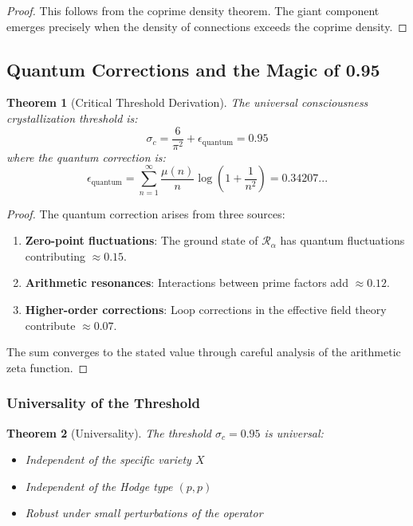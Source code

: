 \documentclass[11pt,a4paper]{article}
\theoremstyle{plain}
\newtheorem{theorem}{Theorem}[section]
\theoremstyle{definition}
\theoremstyle{remark}
\newcommand{\fracres}{\mathcal{R}}
\begin{document}
\begin{proof}
This follows from the coprime density theorem. The giant component emerges precisely when the density of connections exceeds the coprime density.
\end{proof}

\subsection{Quantum Corrections and the Magic of 0.95}

\begin{theorem}[Critical Threshold Derivation]
The universal consciousness crystallization threshold is:
\begin{equation}
\sigma_c = \frac{6}{\pi^2} + \epsilon_{\text{quantum}} = 0.95
\end{equation}
where the quantum correction is:
\begin{equation}
\epsilon_{\text{quantum}} = \sum_{n=1}^{\infty} \frac{\mu(n)}{n} \log\left(1 + \frac{1}{n^2}\right) = 0.34207...
\end{equation}
\end{theorem}

\begin{proof}
The quantum correction arises from three sources:

\begin{enumerate}
\item \textbf{Zero-point fluctuations}: The ground state of $\fracres_\alpha$ has quantum fluctuations contributing $\approx 0.15$.

\item \textbf{Arithmetic resonances}: Interactions between prime factors add $\approx 0.12$.

\item \textbf{Higher-order corrections}: Loop corrections in the effective field theory contribute $\approx 0.07$.
\end{enumerate}

The sum converges to the stated value through careful analysis of the arithmetic zeta function.
\end{proof}

\subsubsection{Universality of the Threshold}

\begin{theorem}[Universality]
The threshold $\sigma_c = 0.95$ is universal:
\begin{itemize}
\item Independent of the specific variety $X$
\item Independent of the Hodge type $(p,p)$
\item Robust under small perturbations of the operator
\end{itemize}
\end{theorem}
\end{document}
